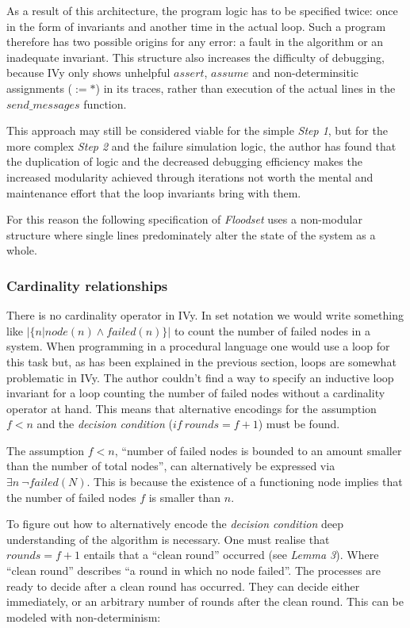 \documentclass[fleqn]{article}
\begin{document}
As a result of this architecture, the program logic has to be specified twice: once in the form of invariants and another time in the actual loop. Such a program therefore has two possible origins for any error: a fault in the algorithm or an inadequate invariant. This structure also increases the difficulty of debugging, because IVy only shows unhelpful $assert$, $assume$ and  non-determinsitic assignments ($:= *$) in its traces, rather than execution of the actual lines in the $send\_messages$ function.

This approach may still be considered viable for the simple \textit{Step 1}, but for the more complex \textit{Step 2} and the failure simulation logic, the author has found that the duplication of logic and the decreased debugging efficiency makes the increased modularity achieved through iterations not worth the mental and maintenance effort that the loop invariants bring with them.

For this reason the following specification of \textit{Floodset} uses a non-modular structure where single lines predominately alter the state of the system as a whole.


\subsubsection{Cardinality relationships}
There is no cardinality operator in IVy. In set notation we would write something like $|\{n|node(n) \land failed(n)\}|$ to count the number of failed nodes in a system. When programming in a procedural language one would use a loop for this task but, as has been explained in the previous section, loops are somewhat problematic in IVy. The author couldn't find a way to specify an inductive loop invariant for a loop counting the number of failed nodes without a cardinality operator at hand. This means that alternative encodings for the assumption $f<n$ and the \textit{decision condition} ($if\ rounds = f+1$) must be found.

The assumption $f<n$, ``number of failed nodes is bounded to an amount smaller than the number of total nodes'', can alternatively be expressed via $\exists n\ \neg failed(N)$. This is because the existence of a functioning node implies that the number of failed nodes $f$ is smaller than $n$.

To figure out how to alternatively encode the \textit{decision condition} deep understanding of the algorithm is necessary. One must realise that $rounds = f+1$ entails that a ``clean round'' occurred (see \textit{Lemma 3}). Where ``clean round'' describes ``a round in which no node failed''. The processes are ready to decide after a clean round has occurred. They can decide either immediately, or an arbitrary number of rounds after the clean round. This can be modeled with non-determinism:
\end{document}
